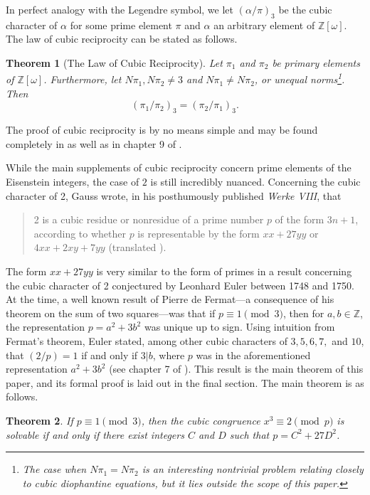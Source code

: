 \documentclass[10pt]{amsart}
\newcommand{\ZZ}{\mathbb{Z}}
\theoremstyle{plain}
\newtheorem{thm}{Theorem}
\theoremstyle{definition}
\theoremstyle{remark}
\numberwithin{equation}{section}
\begin{document}
\indent In perfect analogy with the Legendre symbol, we let $(\alpha/\pi)_{3}$ be the cubic character of $\alpha$ for some prime element $\pi$ and $\alpha$ an arbitrary element of $\ZZ[\omega]$. The law of cubic reciprocity can be stated as follows.

\begin{thm}[The Law of Cubic Reciprocity] \label{The Law of Cubic Reciprocity}
    Let $\pi_{1}$ and $\pi_{2}$ be primary elements of $\ZZ[\omega]$. Furthermore, let $N\pi_{1},N\pi_{2}\neq 3$ and $N\pi_{1}\neq N\pi_{2}$, or unequal norms\footnote{The case when $N\pi_{1}=N\pi_{2}$ is an interesting nontrivial problem relating closely to cubic diophantine equations, but it lies outside the scope of this paper.}. Then 
    \begin{equation*}
        (\pi_{1}/\pi_{2})_{3} = (\pi_{2}/\pi_{1})_{3}.
    \end{equation*}
\end{thm}

The proof of cubic reciprocity is by no means simple and may be found completely in \cite{relyea2024finitefieldshigherreciprocity} as well as in chapter 9 of \cite{ireland1990classical}.

\indent While the main supplements of cubic reciprocity concern prime elements of the Eisenstein integers, the case of $2$ is still incredibly nuanced. Concerning the cubic character of 2, Gauss wrote, in his posthumously published \textit{Werke VIII}, that 

\begin{quote}
    2 is a cubic residue or nonresidue of a prime number $p$ of the form $3n+1$, according to whether $p$ is representable by the form $xx+27yy$ or $4xx+2xy+7yy$ \cite{gauss1900werke8} (translated \cite[pg. 85]{cox2013primes}).
\end{quote}

The form $xx+27yy$ is very similar to the form of primes in a result concerning the cubic character of 2 conjectured by Leonhard Euler between 1748 and 1750. At the time, a well known result of Pierre de Fermat—a consequence of his theorem on the sum of two squares—was that if $p\equiv 1\pmod{3}$, then for $a,b\in\ZZ$, the representation $p=a^{2}+3b^{2}$ was unique up to sign. Using intuition from Fermat's theorem, Euler stated, among other cubic characters of $3,5,6,7,$ and $10$, that $(2/p)=1$ if and only if $3|b$, where $p$ was in the aforementioned representation $a^{2}+3b^{2}$ (see chapter 7 of \cite{lemmermeyer2000reciprocity}). This result is the main theorem of this paper, and its formal proof is laid out in the final section. The main theorem is as follows.
\begin{thm} \label{Theorem: MAIN THEOREM}
    If $p\equiv 1\pmod{3}$, then the cubic congruence $x^{3}\equiv 2\pmod{p}$ is solvable if and only if there exist integers $C$ and $D$ such that $p=C^{2}+27D^{2}$. 
\end{thm}
\end{document}
